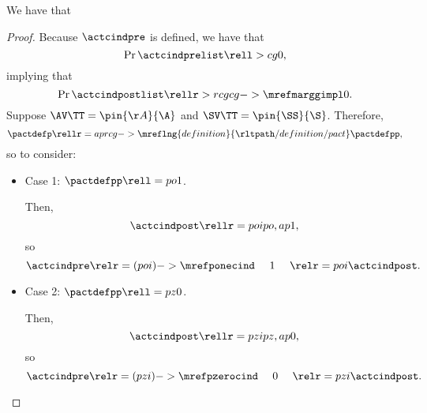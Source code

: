\begin{proposition}
  \nrp
  We have that %
\end{proposition}

\begin{proof}
  \nrp
  Because $\actcindpre$ is defined,
  we have that 
  $$\Pr{\actcindprelist} \rell > cg 0,$$ 
  implying that
  \nrp
  $$\Pr{\actcindpostlist} \rellr > rcg {cg->\mrefmarggimpl} 0.$$
  Suppose 
  \nrp
  $\AV\TT = \pin{\AA}{\A}$
  and
  $\SV\TT = \pin{\SS}{\S}$. Therefore,
  $$\pactdefp \rellr = ap {rcg->\mreflng{definition}{\rltpath/definition/pact}} \pactdefpp,$$
  \nrp
  so  to consider:
  \begin{itemize}
    \item \nrp Case 1: $\pactdefpp \rell = po 1$.

      \nrp
      Then,
      $$\actcindpost \rellr = poi po,ap 1,$$
      \nrp
      so
      $$\actcindpre \relr = (poi)->{\mrefponecind} \ \ \ \ 1\ \ \ \ \relr = poi \actcindpost.$$
    \item \nrp Case 2: $\pactdefpp \rell = pz 0$.

      \nrp
      Then,
      $$\actcindpost \rellr = pzi pz,ap 0,$$
      \nrp
      so
      $$\actcindpre \relr = (pzi)->{\mrefpzerocind} \ \ \ \ 0\ \ \ \ \relr = pzi \actcindpost.$$
  \end{itemize}
\end{proof}

